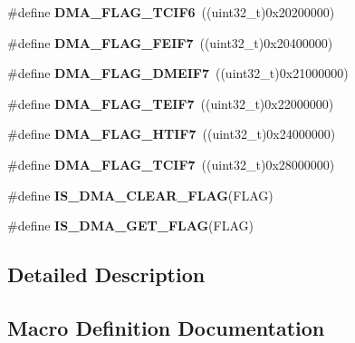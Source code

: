 \begin{DoxyCompactItemize}
\#define {\bfseries D\+M\+A\+\_\+\+F\+L\+A\+G\+\_\+\+T\+C\+I\+F6}~((uint32\+\_\+t)0x20200000)
\item 
\mbox{\label{group___d_m_a__flags__definition_ga4c75ab8fa2339bad9413f133ec9b92d3}} 
\#define {\bfseries D\+M\+A\+\_\+\+F\+L\+A\+G\+\_\+\+F\+E\+I\+F7}~((uint32\+\_\+t)0x20400000)
\item 
\mbox{\label{group___d_m_a__flags__definition_gae8b9016059eef77580e3845d30c1f42f}} 
\#define {\bfseries D\+M\+A\+\_\+\+F\+L\+A\+G\+\_\+\+D\+M\+E\+I\+F7}~((uint32\+\_\+t)0x21000000)
\item 
\mbox{\label{group___d_m_a__flags__definition_ga4f4acb7f0b6c46a1af27733852ef4fc7}} 
\#define {\bfseries D\+M\+A\+\_\+\+F\+L\+A\+G\+\_\+\+T\+E\+I\+F7}~((uint32\+\_\+t)0x22000000)
\item 
\mbox{\label{group___d_m_a__flags__definition_gaa59fb75c0964ea148a2218baba8de255}} 
\#define {\bfseries D\+M\+A\+\_\+\+F\+L\+A\+G\+\_\+\+H\+T\+I\+F7}~((uint32\+\_\+t)0x24000000)
\item 
\mbox{\label{group___d_m_a__flags__definition_ga5a68888ca361abf00d552bdd70304ea9}} 
\#define {\bfseries D\+M\+A\+\_\+\+F\+L\+A\+G\+\_\+\+T\+C\+I\+F7}~((uint32\+\_\+t)0x28000000)
\item 
\#define {\bfseries I\+S\+\_\+\+D\+M\+A\+\_\+\+C\+L\+E\+A\+R\+\_\+\+F\+L\+AG}(F\+L\+AG)
\item 
\#define {\bfseries I\+S\+\_\+\+D\+M\+A\+\_\+\+G\+E\+T\+\_\+\+F\+L\+AG}(F\+L\+AG)
\end{DoxyCompactItemize}


\subsection{Detailed Description}


\subsection{Macro Definition Documentation}
\mbox{\label{group___d_m_a__flags__definition_ga4b33e418489c9a3c9adcbdbaca93e4a3}} 
